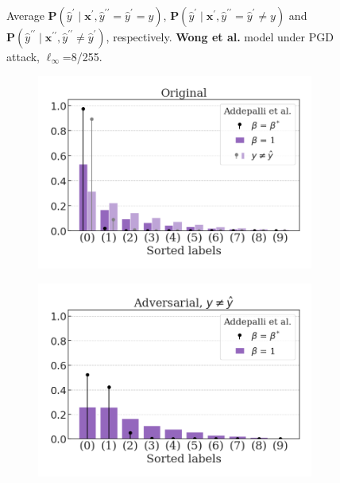 \begin{figure}[H]
    \caption{Average $\mathbf{P}(\hat{y}^\prime \mid \mathbf{x}^\prime, \hat{y}^{\prime \prime} = \hat{y}^\prime = y)$,
    $\mathbf{P}(\hat{y}^\prime \mid \mathbf{x}^\prime, \hat{y}^{\prime \prime} = \hat{y}^\prime \neq y)$ and
    $\mathbf{P}(\hat{y}^{\prime \prime} \mid \mathbf{x}^{\prime \prime}, \hat{y}^{\prime \prime} \neq \hat{y}^\prime)$,
    respectively. {\color{tab:red} \textbf{Wong et al.}} model under PGD attack, $\ell_\infty$=8/255.}
    \label{fig:pgd_distributions_wong2020}
\end{figure}
\begin{figure}[H]
    \centering
    \begin{subfigure}[b]{0.45\textwidth}
        \centering
        \includegraphics[width=\textwidth]{img/results_discussion/adversarial/Addepalli2021Towards_RN18_orig_PGD_0.0314.png}
    \end{subfigure}
    \hfill
    \begin{subfigure}[b]{0.45\textwidth}
        \centering
        \includegraphics[width=\textwidth]{img/results_discussion/adversarial/Addepalli2021Towards_RN18_adv_PGD_0.0314.png}
    \end{subfigure}


\end{figure}
